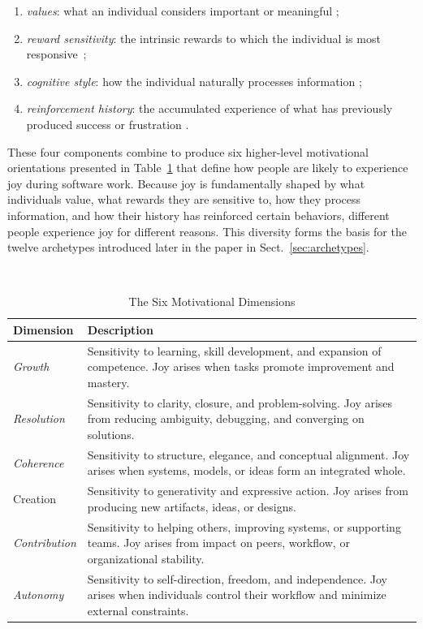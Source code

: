 \documentclass[12pt]{elsarticle}
\begin{document}
\begin{enumerate}
    \item {\textit{values}}: what an individual considers important or
    meaningful \cite{schwartz1992universals};
    \item {\textit{reward sensitivity}}: the intrinsic rewards to which the
    individual is most responsive~\cite{deci1985intrinsic};
    \item {\textit{cognitive style}}: how the individual naturally processes
    information \cite{kozhevnikov2007cognitive};
    \item {\textit{reinforcement history}}: the accumulated experience of what
    has previously produced success or frustration \cite{anderson2004learning}.
\end{enumerate}

These four components combine to produce six higher-level motivational
orientations presented in Table~\ref{tab:dimensions} that define how people are likely to experience joy during
software work. Because joy is fundamentally shaped by what individuals value,
what rewards they are sensitive to, how they process information, and how
their history has reinforced certain behaviors, different people experience
joy for different reasons. This diversity forms the basis for the twelve
archetypes introduced later in the paper in Sect.~\ref{sec:archetypes}.

\begin{table}[H]
\centering
\caption{The Six Motivational Dimensions}\
\label{tab:dimensions}
\footnotesize
\begin{tabularx}{\linewidth}{lX}
\toprule
\textbf{Dimension} & \textbf{Description} \\
\midrule
{\textit{Growth}} & Sensitivity to learning, skill development, and expansion of competence. Joy arises when tasks promote improvement and mastery. \\[3pt]

{\textit{Resolution}} & Sensitivity to clarity, closure, and problem-solving. Joy arises from reducing ambiguity, debugging, and converging on solutions. \\[3pt]

{\textit{Coherence}} & Sensitivity to structure, elegance, and conceptual alignment. Joy arises when systems, models, or ideas form an integrated whole. \\[3pt]

{Creation} & Sensitivity to generativity and expressive action. Joy arises from producing new artifacts, ideas, or designs. \\[3pt]

{\textit{Contribution}} & Sensitivity to helping others, improving systems, or supporting teams. Joy arises from impact on peers, workflow, or organizational stability. \\[3pt]

{\textit{Autonomy}} & Sensitivity to self-direction, freedom, and independence. Joy arises when individuals control their workflow and minimize external constraints. \\
\bottomrule
\end{tabularx}
\end{table}
\end{document}
